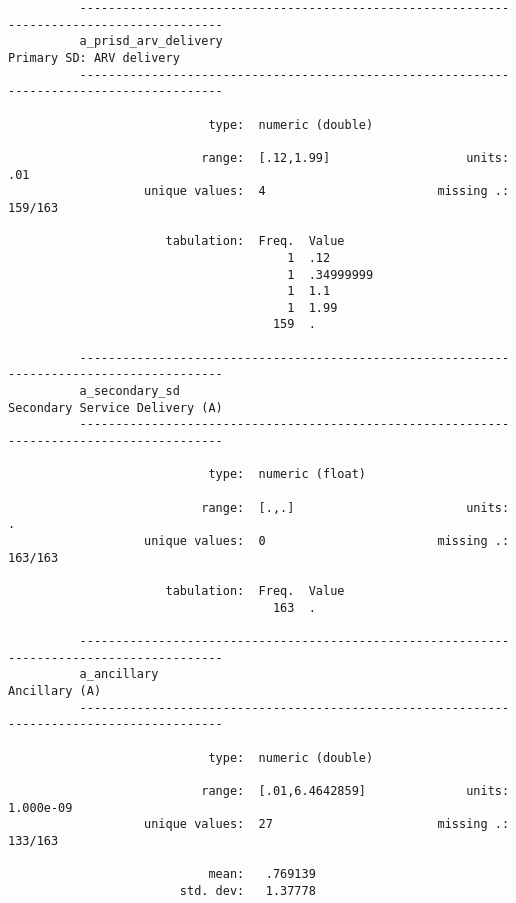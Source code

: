 \documentclass{article}
\begin{document}
\begin{verbatim}
          ------------------------------------------------------------------------------------------
          a_prisd_arv_delivery                                              Primary SD: ARV delivery
          ------------------------------------------------------------------------------------------
          
                            type:  numeric (double)
          
                           range:  [.12,1.99]                   units:  .01
                   unique values:  4                        missing .:  159/163
          
                      tabulation:  Freq.  Value
                                       1  .12
                                       1  .34999999
                                       1  1.1
                                       1  1.99
                                     159  .
          
          ------------------------------------------------------------------------------------------
          a_secondary_sd                                              Secondary Service Delivery (A)
          ------------------------------------------------------------------------------------------
          
                            type:  numeric (float)
          
                           range:  [.,.]                        units:  .
                   unique values:  0                        missing .:  163/163
          
                      tabulation:  Freq.  Value
                                     163  .
          
          ------------------------------------------------------------------------------------------
          a_ancillary                                                                  Ancillary (A)
          ------------------------------------------------------------------------------------------
          
                            type:  numeric (double)
          
                           range:  [.01,6.4642859]              units:  1.000e-09
                   unique values:  27                       missing .:  133/163
          
                            mean:   .769139
                        std. dev:   1.37778
          

\end{verbatim}
\end{document}

